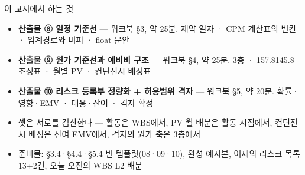 \begin{frame}{이 교시에서 하는 것}
\begin{itemize}
\item \textbf{산출물 ⑧ 일정 기준선} — 워크북 §3, 약 25분. 제약 일자 · CPM 계산표의 빈칸 · 임계경로와 버퍼 · float 문안
\item \textbf{산출물 ⑨ 원가 기준선과 예비비 구조} — 워크북 §4, 약 25분. 3층 · 157.8\ra{}145.8 조정표 · 월별 PV · 컨틴전시 배정표
\item \textbf{산출물 ⑩ 리스크 등록부 정량화 + 허용범위 격자} — 워크북 §5, 약 20분. 확률·영향·EMV · 대응·잔여 · 격자 확정
\item 셋은 서로를 검산한다 — 활동은 WBS에서, PV 월 배분은 활동 시점에서, 컨틴전시 배정은 잔여 EMV에서, 격자의 원가 축은 3층에서
\item 준비물: §3.4·§4.4·§5.4 빈 템플릿(08·09·10), 완성 예시본, 어제의 리스크 목록 13+2건, 오늘 오전의 WBS L2 배분
\end{itemize}
\end{frame}

